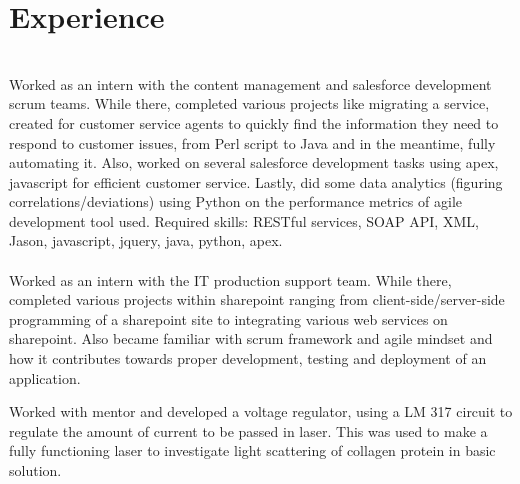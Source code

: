 \documentclass[]{deedy-resume-openfont}
\begin{document}
\begin{minipage}[t]{0.71\textwidth}
\section{Experience}
 \\
\large Worked as an intern with the content management and salesforce development scrum teams. While there, completed various projects like migrating a service, created for customer service agents to quickly find the information they need to respond to customer issues, from Perl script to Java and in the meantime, fully automating it. Also, worked on several salesforce development tasks using apex, javascript for efficient customer service. Lastly, did some data analytics (figuring correlations/deviations) using Python on the performance metrics of agile development tool used. Required skills: RESTful services, SOAP API, XML, Jason, javascript, jquery, java, python, apex. \\
\medskip
{} \\
\large Worked as an intern with the IT production support team. While there, completed various projects within sharepoint ranging from client-side/server-side programming of a sharepoint site to integrating various web services on sharepoint. Also became familiar with scrum framework and agile mindset and how it contributes towards proper development, testing and deployment of an application.



 



 






\medskip
{}

\vspace{\topsep} %

\vspace*{-\baselineskip}
\smallskip
 \large

 
\large Worked with mentor and developed a voltage regulator, using a LM 317 circuit to regulate the amount of current to be passed in laser. This was used to make a fully functioning laser to investigate light scattering of collagen protein in basic solution. 


\end{minipage}
\end{document}

